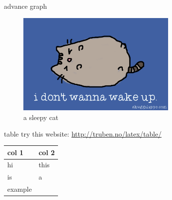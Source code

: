 \documentclass[usenames,dvipsnames]{beamer}
\begin{document}
\begin{frame}{advance graph}
    \begin{figure}
        \centering
        \caption{a sleepy cat}
        \includegraphics[width=0.7\textwidth]{cat.png}
    \end{figure}
\end{frame}

\begin{frame}{table}
    try this website: \url{http://truben.no/latex/table/}
    \begin{table}
        \begin{tabular}{l|l}
            col 1   & col 2 \\ \hline
            hi      & this  \\
            is      & a     \\
            example & ~     \\
        \end{tabular}
    \end{table}
\end{frame}
\end{document}

